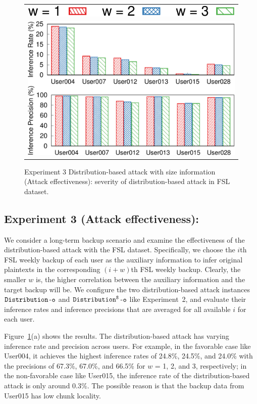 \begin{figure}[t]
     \centering
    \centering
    \begin{tabular}{c}
        \includegraphics[width=.35\textwidth]{pic/legend-effectiveness.pdf}\\
        \includegraphics[width=.7\textwidth]{pic/distribution-effectiveness-w-size.pdf}
    \end{tabular}
	\caption{Experiment 3 Distribution-based attack with size information (Attack effectiveness): severity of distribution-based attack in FSL dataset.}
	\label{fig:experiment-distribution-effectiveness}
\end{figure}



\subsection{Experiment 3 (Attack effectiveness):} We consider a long-term
backup scenario and examine the effectiveness of the distribution-based attack
with the FSL dataset. Specifically, we choose the $i$th FSL weekly backup of
each user as the auxiliary information to infer original plaintexts in the corresponding $(i+w)$th FSL
weekly backup. Clearly, the smaller $w$ is, the higher correlation between the
auxiliary information and the target backup will be.  We configure the two  
distribution-based attack instances $\tt Distribution$-$\tt o$ and $\tt Distribution^S$-$\tt o$
like Experiment~2, and evaluate their inference rates and inference precisions that
are averaged for all available $i$ for each user. 

Figure~\ref{fig:experiment-distribution-effectiveness}(a) shows the results. The
distribution-based attack has varying inference rate and precision  across
users. For example, in the favorable case like User004, it achieves the
highest inference rates of 24.8\%, 24.5\%, and 24.0\% with the precisions of
67.3\%, 67.0\%, and 66.5\% for $w$ = 1, 2, and 3, respectively; in the
non-favorable case like User015, the inference rate of the distribution-based
attack is only around 0.3\%. The possible reason is that the backup data from
User015 has low chunk locality. 

